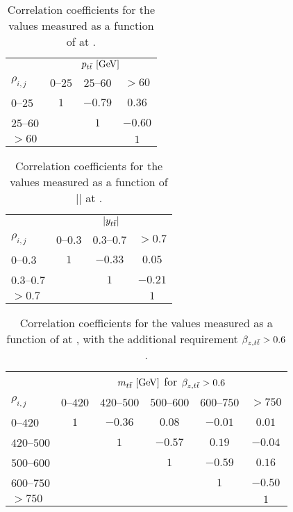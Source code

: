 \begin{table}[!htp]\centering
\begin{tabular}{l c c c }
  \toprule
  &\multicolumn{3}{c}{$p_{t\bar{t}}{}~[\rm{GeV}]$}    \\
  $\rho_{i,j}$      &     $0$--$25$           &        $25$--$60$         &  $>60$            \\
  \midrule
  $0$--$25$       &    $1$    &    $-0.79$  &   $0.36$  \\
  $25$--$60$      &           &    $1$      &   $-0.60$ \\
  $>60$           &           &             &   $1$     \\
  \bottomrule
\end{tabular}
\caption{Correlation coefficients for the \ac{} values measured as a
  function of \pttt{} at \seventev{}.}
\label{tab:corr_pttt}
\end{table}

\begin{table}[!htp]\centering
\begin{tabular}{l c c c }
  \toprule
  &\multicolumn{3}{c}{$|y_{t\bar{t}}{}|$}    \\
  $\rho_{i,j}$      &  $0$--$0.3$   &  $0.3$--$0.7$  &  $>0.7$  \\
  \midrule
  $0$--$0.3$    &   $1$   &   $-0.33$  &   $0.05$   \\
  $0.3$--$0.7$  &         &   $1$      &   $-0.21$  \\
  $>0.7$        &         &            &   $1$      \\
  \bottomrule
\end{tabular}
\caption{Correlation coefficients for the \ac{} values measured as a
  function of |\ytt{}| at \seventev{}.}
\label{tab:corr_ytt}
\end{table}

\begin{table}[!htp]\centering
\begin{tabular}{l c c c c c }
  \toprule
  &\multicolumn{5}{c}{$m_{t\bar{t}}{}~[\rm{GeV}]$ for $\beta_{z,t\bar{t}}{}> 0.6$}    \\
  $\rho_{i,j}$ & $0$--$420$ & $420$--$500$ & $500$--$600$ & $600$--$750$ & $>750$ \\
  \midrule
  $0$--$420$      & $1$ & $-0.36$ & $0.08$  & $-0.01$ & $0.01$  \\
  $420$--$500$    &     & $1$     & $-0.57$ & $0.19$  & $-0.04$ \\
  $500$--$600$    &     &         & $1$     & $-0.59$ & $0.16$  \\
  $600$--$750$    &     &         &         & $1$     & $-0.50$ \\
  $>750$          &     &         &         &         & $1$     \\
  \bottomrule
\end{tabular}
\caption{Correlation coefficients for the \ac{} values measured as a
  function of \mtt{} at \seventev{}, with the additional requirement $\beta_{z,t\bar{t}}{}>0.6$.}
\label{tab:corr_mtt_beta}
\end{table}

